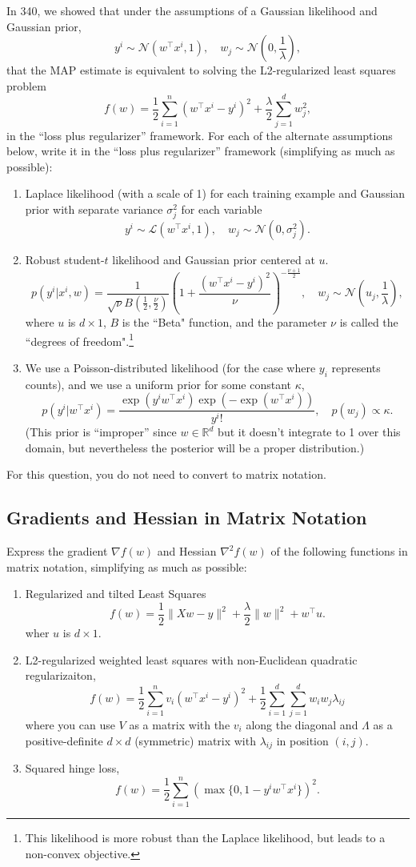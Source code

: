 \documentclass{article}
\def\blu#1{{\color{blu}#1}}
\def\norm#1{\|#1\|}
\def\R{\mathbb{R}}
\def\half{\frac 1 2}
\def\enum#1{\begin{enumerate}#1\end{enumerate}}
\begin{document}
In 340, we showed that under the assumptions of a Gaussian likelihood and Gaussian prior,
\[
y^i \sim \mathcal{N}(w^\top x^i,1), \quad w_j \sim \mathcal{N}\left(0,\frac{1}{\lambda}\right),
\]
that the MAP estimate is equivalent to solving the L2-regularized least squares problem
\[
f(w) = \frac{1}{2}\sum_{i=1}^n (w^\top x^i - y^i)^2 + \frac \lambda 2 \sum_{j=1}^d w_j^2,
\]
in the ``loss plus regularizer'' framework.
For each of the alternate assumptions below, write it in the ``loss plus regularizer'' framework (simplifying as much as possible):
\blu{\enum{
\item Laplace likelihood (with a scale of 1) for each training example and Gaussian prior with separate variance $\sigma_j^2$ for each variable
\[
y^i \sim \mathcal{L}(w^\top x^i,1), \quad w_j \sim \mathcal{N}\left(0,\sigma_j^2\right).
\]
\item Robust student-$t$ likelihood and Gaussian prior centered at $u$.
\[
p(y^i | x^i, w) = \frac{1}{\sqrt{\nu}B\left(\frac 1 2,\frac \nu 2\right)}\left(1 + \frac{(w^\top x^i - y^i)^2}{\nu}\right)^{-\frac{\nu + 1}{2}}, \quad w_j \sim \mathcal{N}\left(u_j,\frac{1}{\lambda}\right),
\]
where $u$ is $d \times 1$, $B$ is the ``Beta" function, and the parameter $\nu$ is called the ``degrees of freedom".\footnote{This likelihood is more robust than the Laplace likelihood, but leads to a non-convex objective.}
\item We use a Poisson-distributed likelihood (for the case where $y_i$ represents counts), and we use a uniform prior for some constant $\kappa$,
\[
p(y^i | w^\top x^i) = \frac{\exp(y^iw^\top x^i)\exp(-\exp(w^\top x^i))}{y^i!}, \quad p(w_j) \propto \kappa.
\]
(This prior is 	``improper'' since $w\in\R^d$ but it doesn't integrate to 1 over this domain, but nevertheless the posterior will be a proper distribution.)
}}
For this question, you do not need to convert to matrix notation.




\subsection{Gradients and Hessian in Matrix Notation}

Express the gradient $\nabla f(w)$ and Hessian $\nabla^2 f(w)$ of the following functions in matrix notation, simplifying as much as possible:
\blu{
\enum{
\item Regularized and tilted Least Squares
\[
f(w) = \half\norm{Xw- y}^2 + \frac \lambda 2 \norm{w}^2 + w^\top u.
\]
wher $u$ is $d \times 1$.
\item L2-regularized weighted least squares with non-Euclidean quadratic regularizaiton,
\[
f(w) = \frac{1}{2}\sum_{i=1}^n v_i(w^\top x^i - y^i)^2 + \frac{1}{2}\sum_{i=1}^d\sum_{j=1}^d w_iw_j\lambda_{ij}
\]
where you can use $V$ as a matrix with the $v_i$ along the diagonal and $\Lambda$ as a positive-definite $d \times d$ (symmetric) matrix with $\lambda_{ij}$ in position $(i,j)$.
\item Squared hinge loss,
\[
f(w) = \half \sum_{i=1}^n \left(\max\{0,1-y^iw^\top x^i\}\right)^2.
\]
}}
\end{document}
